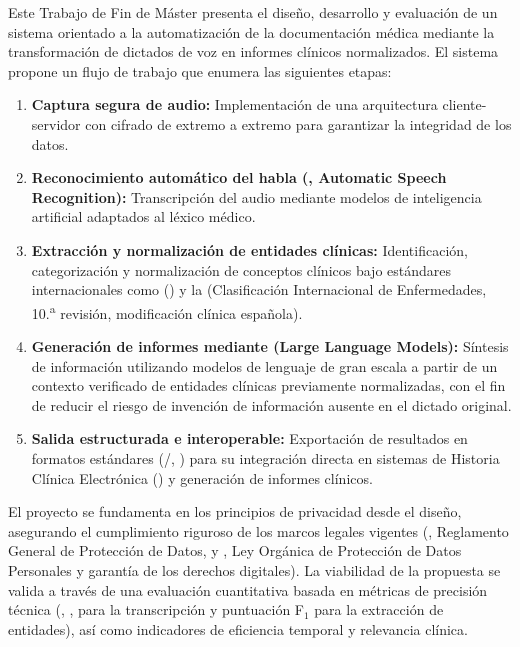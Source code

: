 
Este Trabajo de Fin de Máster presenta el diseño, desarrollo y evaluación de un sistema 
orientado a la automatización de la documentación médica mediante la 
transformación de dictados de voz en informes clínicos normalizados. 
El sistema propone un flujo de trabajo  que enumera las 
siguientes etapas:
\begin{enumerate}
    \setlength{\itemsep}{1pt}
    \setlength{\parsep}{0pt}
    \setlength{\topsep}{4pt}
    \item \textbf{Captura segura de audio:} 
        Implementación de una arquitectura cliente-servidor con cifrado de extremo a extremo
        para garantizar la integridad de los datos.
    \item \textbf{Reconocimiento automático del habla (, Automatic Speech Recognition):} 
        Transcripción del audio mediante modelos de inteligencia artificial
        adaptados al léxico médico.
    \item \textbf{Extracción y normalización de entidades clínicas:}
        Identificación, categorización y normalización de conceptos clínicos bajo estándares
        internacionales como  ()
        y la  (Clasificación Internacional de Enfermedades, 10.\textsuperscript{a} revisión,
        modificación clínica española).
    \item \textbf{Generación de informes mediante  (Large Language Models):}
        Síntesis de información utilizando modelos de lenguaje de gran escala a partir de un
        contexto verificado de entidades clínicas previamente normalizadas, con el fin de
        reducir el riesgo de invención de información ausente en el dictado original.
    \item \textbf{Salida estructurada e interoperable:}
        Exportación de resultados en formatos estándares (/,
        )
        para su integración directa en sistemas de Historia Clínica Electrónica () y
        generación de informes clínicos.
\end{enumerate}

El proyecto se fundamenta en los principios de privacidad desde el diseño,
asegurando el cumplimiento riguroso de los marcos legales vigentes (, Reglamento General de
Protección de Datos, y , Ley Orgánica de Protección de Datos Personales y garantía de los
derechos digitales).
La viabilidad de la propuesta se valida a través de una evaluación cuantitativa basada en métricas de precisión técnica
(, , para la transcripción y puntuación F$_{1}$ para la extracción de entidades),
así como indicadores de eficiencia temporal y relevancia clínica.
